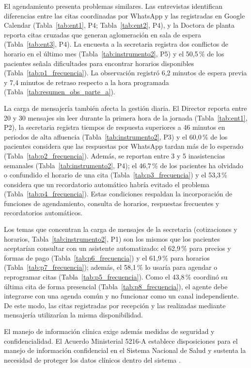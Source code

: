 El agendamiento presenta problemas similares. Las entrevistas identifican diferencias entre las citas coordinadas por WhatsApp y las registradas en Google Calendar (Tabla~\ref{tab:ent1}, P4; Tabla~\ref{tab:ent2}, P4), y la Doctora de planta reporta citas cruzadas que generan aglomeración en sala de espera (Tabla~\ref{tab:ent3}, P4). La encuesta a la secretaria registra dos conflictos de horario en el último mes (Tabla~\ref{tab:instrumento2}, P5) y el 50,5\,\% de los pacientes señala dificultades para encontrar horarios disponibles (Tabla~\ref{tab:p1_frecuencia}). La observación registró 6,2 minutos de espera previa y 7,4 minutos de retraso respecto a la hora programada (Tabla~\ref{tab:resumen_obs_parte_a}). 

La carga de mensajería también afecta la gestión diaria. El Director reporta entre 20 y 30 mensajes sin leer durante la primera hora de la jornada (Tabla~\ref{tab:ent1}, P2), la secretaria registra tiempos de respuesta superiores a 46 minutos en periodos de alta afluencia (Tabla~\ref{tab:instrumento2}, P3) y el 60,0\,\% de los pacientes considera que las respuestas por WhatsApp tardan más de lo esperado (Tabla~\ref{tab:p2_frecuencia}). Además, se reportan entre 3 y 5 inasistencias semanales (Tabla~\ref{tab:instrumento2}, P4); el 46,7\,\% de los pacientes ha olvidado o confundido el horario de una cita (Tabla~\ref{tab:p3_frecuencia}) y el 53,3\,\% considera que un recordatorio automático habría evitado el problema (Tabla~\ref{tab:p4_frecuencia}). Estas condiciones respaldan la incorporación de funciones de agendamiento, consulta de horarios, respuestas frecuentes y recordatorios automáticos.

Los temas que concentran la carga de mensajes de la secretaria (cotizaciones y horarios, Tabla~\ref{tab:instrumento2}, P1) son los mismos que los pacientes aceptarían consultar con un asistente automatizado: el 62,9\,\% para precios y formas de pago (Tabla~\ref{tab:p6_frecuencia}) y el 61,9\,\% para horarios (Tabla~\ref{tab:p7_frecuencia}); además, el 58,1\,\% lo usaría para agendar o reprogramar citas (Tabla~\ref{tab:p5_frecuencia}). Como el 43,8\,\% coordinó su última cita de forma presencial (Tabla~\ref{tab:p8_frecuencia}), el agente debe integrarse con una agenda común y no funcionar como un canal independiente. De este modo, las citas registradas por recepción y las realizadas mediante mensajería utilizarían la misma disponibilidad.

El manejo de información clínica exige además medidas de seguridad y confidencialidad. El Acuerdo Ministerial 5216-A establece disposiciones para el manejo de información confidencial en el Sistema Nacional de Salud y sustenta la necesidad de proteger los datos clínicos dentro del sistema \cite{msp5216a}. 


